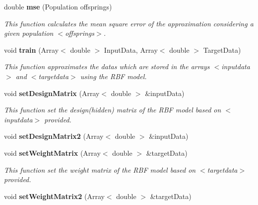 \begin{CompactItemize}
\item 
double {\bf mse} (Population offsprings)
\begin{CompactList}\small\item\em This function calculates the mean square error of the approximation considering a given population $<$offsprings$>$. \item\end{CompactList}\item 
void {\bf train} (Array$<$ double $>$ Input\-Data, Array$<$ double $>$ Target\-Data)
\begin{CompactList}\small\item\em This function approximates the datas which are stored in the arrays $<$inputdata$>$ and $<$targetdata$>$ using the RBF model. \item\end{CompactList}\item 
void {\bf set\-Design\-Matrix} (Array$<$ double $>$ \&input\-Data)
\begin{CompactList}\small\item\em This function set the design(hidden) matrix of the RBF model based on $<$inputdata$>$ provided. \item\end{CompactList}\item 
void {\bf set\-Design\-Matrix2} (Array$<$ double $>$ \&input\-Data)\label{classRBF_a14}

\item 
void {\bf set\-Weight\-Matrix} (Array$<$ double $>$ \&target\-Data)
\begin{CompactList}\small\item\em This function set the weight matrix of the RBF model based on $<$targetdata$>$ provided. \item\end{CompactList}\item 
void {\bf set\-Weight\-Matrix2} (Array$<$ double $>$ \&target\-Data)\label{classRBF_a16}


\end{CompactItemize}
